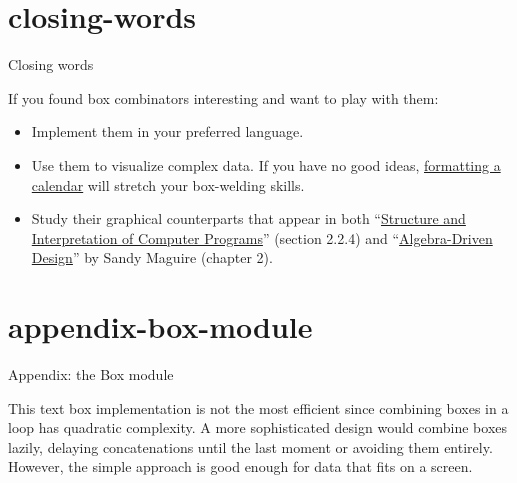 \documentclass{article}
\begin{document}
\section{closing-words}{Closing words}

If you found box combinators interesting and want to play with them:
\begin{itemize}
\item Implement them in your preferred language.
\item Use them to visualize complex data.
If you have no good ideas, \href{https://wiki.dlang.org/Component_programming_with_ranges#Case_Study:_Formatting_a_Calendar}{formatting a calendar}
will stretch your box-welding skills.
\item
Study their graphical counterparts that appear in both
``\href{https://mitp-content-server.mit.edu/books/content/sectbyfn/books_pres_0/6515/sicp.zip/full-text/book/book-Z-H-15.html#%25_sec_2.2.4}{Structure and Interpretation of Computer Programs}''
(section 2.2.4)
and ``\href{https://www.goodreads.com/book/show/53001511-algebra-driven-design}{Algebra-Driven Design}'' by Sandy Maguire
(chapter 2).
\end{itemize}

\section{appendix-box-module}{Appendix: the Box module}

This text box implementation is not the most efficient since combining boxes in a loop has quadratic complexity.
A more sophisticated design would combine boxes lazily, delaying concatenations until the last moment or avoiding them entirely.
However, the simple approach is good enough for data that fits on a screen.
\end{document}
